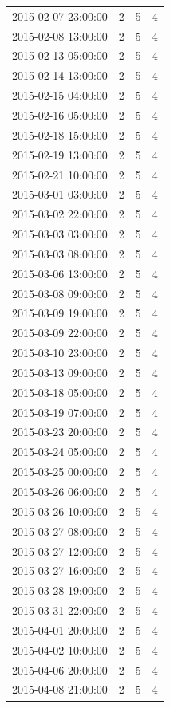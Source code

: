 \begin{tabular}{lrrr}
2015-02-07 23:00:00 & 2 & 5 & 4 \\
2015-02-08 13:00:00 & 2 & 5 & 4 \\
2015-02-13 05:00:00 & 2 & 5 & 4 \\
2015-02-14 13:00:00 & 2 & 5 & 4 \\
2015-02-15 04:00:00 & 2 & 5 & 4 \\
2015-02-16 05:00:00 & 2 & 5 & 4 \\
2015-02-18 15:00:00 & 2 & 5 & 4 \\
2015-02-19 13:00:00 & 2 & 5 & 4 \\
2015-02-21 10:00:00 & 2 & 5 & 4 \\
2015-03-01 03:00:00 & 2 & 5 & 4 \\
2015-03-02 22:00:00 & 2 & 5 & 4 \\
2015-03-03 03:00:00 & 2 & 5 & 4 \\
2015-03-03 08:00:00 & 2 & 5 & 4 \\
2015-03-06 13:00:00 & 2 & 5 & 4 \\
2015-03-08 09:00:00 & 2 & 5 & 4 \\
2015-03-09 19:00:00 & 2 & 5 & 4 \\
2015-03-09 22:00:00 & 2 & 5 & 4 \\
2015-03-10 23:00:00 & 2 & 5 & 4 \\
2015-03-13 09:00:00 & 2 & 5 & 4 \\
2015-03-18 05:00:00 & 2 & 5 & 4 \\
2015-03-19 07:00:00 & 2 & 5 & 4 \\
2015-03-23 20:00:00 & 2 & 5 & 4 \\
2015-03-24 05:00:00 & 2 & 5 & 4 \\
2015-03-25 00:00:00 & 2 & 5 & 4 \\
2015-03-26 06:00:00 & 2 & 5 & 4 \\
2015-03-26 10:00:00 & 2 & 5 & 4 \\
2015-03-27 08:00:00 & 2 & 5 & 4 \\
2015-03-27 12:00:00 & 2 & 5 & 4 \\
2015-03-27 16:00:00 & 2 & 5 & 4 \\
2015-03-28 19:00:00 & 2 & 5 & 4 \\
2015-03-31 22:00:00 & 2 & 5 & 4 \\
2015-04-01 20:00:00 & 2 & 5 & 4 \\
2015-04-02 10:00:00 & 2 & 5 & 4 \\
2015-04-06 20:00:00 & 2 & 5 & 4 \\
2015-04-08 21:00:00 & 2 & 5 & 4 \\

\end{tabular}
